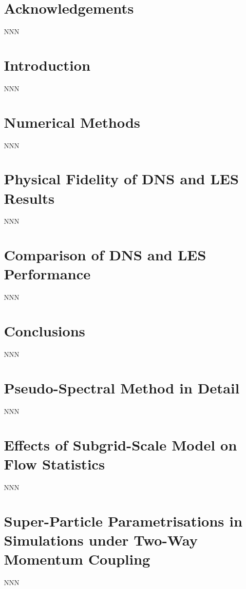 \documentclass{pracamgren}
\begin{document}
\begin{abstract}
\end{abstract}


\tableofcontents


\chapter*{Acknowledgements}
\label{ch:ack}

NNN



\chapter*{Introduction}
\label{ch:int}

NNN


\chapter{Numerical Methods}
\label{ch:ch1}

NNN


\chapter{Physical Fidelity of DNS and LES Results}
\label{ch:ch2}

NNN



\chapter{Comparison of DNS and LES Performance}
\label{ch:ch3}

NNN



\chapter*{Conclusions}
\label{ch:end}

NNN


\appendix
\chapter{Pseudo-Spectral Method in Detail}
\label{app:psm}

NNN



\chapter{Effects of Subgrid-Scale Model on Flow Statistics}
\label{app:sgs}

NNN


\chapter{Super-Particle Parametrisations in Simulations under Two-Way Momentum Coupling}
\label{app:spp}

NNN


\printbibliography[title=References]
\end{document}
